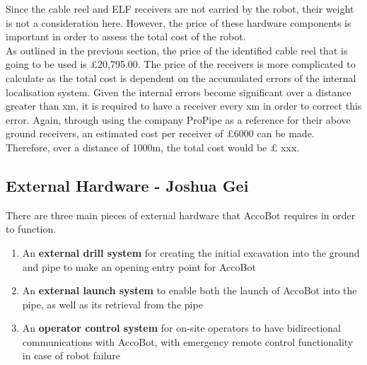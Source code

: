 \documentclass[11pt]{article}		%
\begin{document}
	        \begin{floatingfigure}[r]{0pt} \end{floatingfigure}

			Since the cable reel and ELF receivers are not carried by the robot, their weight is not a consideration here. However, the price of these hardware components is important in order to assess the total cost of the robot. \\
			\hspace*{3ex}As outlined in the previous section, the price of the identified cable reel that is going to be used is £20,795.00. The price of the receivers is more complicated to calculate as the total cost is dependent on the accumulated errors of the internal localisation system. Given the internal errors become significant over a distance greater than xm, it is required to have a receiver every xm in order to correct this error. Again, through using the company ProPipe as a reference for their above ground receivers, an estimated cost per receiver of £6000 can be made. Therefore, over a distance of 1000m, the total cost would be £ xxx. 
	
		\subsection[External Hardware]{External Hardware - Joshua Gei}
		There are three main pieces of external hardware that AccoBot requires in order to function. 
        \begin{enumerate}
        \item An \textbf{external drill system} for creating the initial excavation into the ground and pipe to make an opening entry point for AccoBot
        \item An \textbf{external launch system} to enable both the launch of AccoBot into the pipe, as well as its retrieval from the pipe
        \item An \textbf{operator control system} for on-site operators to have bidirectional communications with AccoBot, with emergency remote control functionality in case of robot failure
        \end{enumerate}
		
\end{document}
